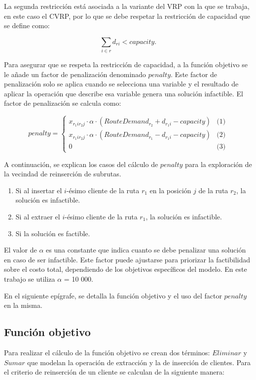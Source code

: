 \documentclass[12pt]{report}
\begin{document}
 	La segunda restricción está asociada a la variante del VRP con la que se trabaja, en este caso el CVRP, por lo que se debe respetar la restricción de capacidad que se define como:

    \[ 		\sum \limits_{i \in r} d_{ri} < capacity\text{.} \]

    Para asegurar que se respeta la restricción de capacidad, a la función objetivo se le añade un factor de penalización denominado $penalty$. Este factor de penalización solo se aplica cuando se selecciona una variable y el resultado de aplicar la operación que describe esa variable genera una solución infactible. El factor de penalización se calcula como:

    \[
    penalty =
    \begin{cases}
    	x_{r_1ir_2j} \cdot \alpha \cdot ( RouteDemand_{r_2} + d_{r_1i} - capacity) & \text{(1)} \\
    	x_{r_1ir_2j} \cdot \alpha \cdot (RouteDemand_{r_1} - d_{r_1i} - capacity) & \text{(2)} \\
    	0 & \text{(3)}
    \end{cases}
    \]

    A continuación, se explican los casos del cálculo de $penalty$ para la exploración de la vecindad de reinserción de subrutas.

    \begin{enumerate}
    	\item Si al insertar el $i$-ésimo cliente de la ruta $r_1$ en la posición $j$ de la ruta $r_2$, la solución es infactible.
    	\item Si al extraer el $i$-ésimo cliente de la ruta $r_1$, la solución es infactible.
    	\item Si la solución es factible.
    \end{enumerate}
    El valor de $\alpha$ es una constante que indica cuanto se debe penalizar una solución en caso de ser infactible. Este factor puede ajustarse para priorizar la factibilidad sobre el costo total, dependiendo de los objetivos específicos del modelo. En este trabajo se utiliza $\alpha$ = 10 000.

    En el siguiente epígrafe, se detalla la función objetivo y el uso del factor $penalty$ en la misma.

    \subsection{Función objetivo}
    Para realizar el cálculo de la función objetivo se crean dos términos: $Eliminar$ y $Sumar$ que modelan la operación de extracción y la de inserción de clientes. Para el criterio de reinserción de un cliente se calculan de la siguiente manera:
\end{document}
